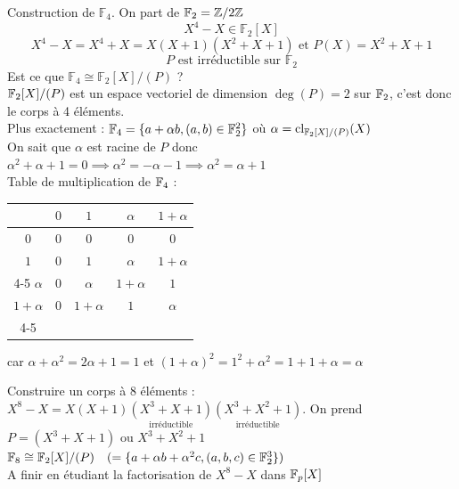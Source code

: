 \documentclass[]{report}
\begin{document}
    \begin{ex}{}{}
        Construction de $\mathbb{F}_4$. On part de $\mathbb{F}_2=\mathbb{Z}/2\mathbb{Z}$
        \[X^4-X\in\mathbb{F}_2[X]\]
        \[X^4-X=X^4+X=X(X+1)(X^2+X+1)\text{ et } P (X)=X^2+X+1\]
        \[P \text{ est irréductible sur }\mathbb{F}_2\]
        Est ce que $\mathbb{F}_4 \cong\mathbb{F}_2[X]/ (P)$ ?\\
        $\mathbb{F}_2[X]/(P)$ est un espace vectoriel de dimension $\deg(P)=2$ sur $\mathbb{F}_2$, c'est donc le corps à 4 éléments.\\
        Plus exactement : $\mathbb{F}_4=\{a+\alpha b,(a,b)\in\mathbb{F}_2^2\}$ où $\alpha={\text{cl}}_{\mathbb{F}_2[X]/(P)}(X)$\\
        On sait que $\alpha$ est racine de $P$ donc $\alpha^2+\alpha+1=0\implies \alpha^2=-\alpha-1\implies\alpha^2=\alpha+1$\\
        Table de multiplication de $\mathbb{F}_4$ :\\
        \begin{center}
            \begin{tabular}{c|c c c c}
                     &$0$&$1$& $\alpha$&$1+\alpha$\\
            \hline
            $0$&$0$&$0$&$0$&$0$\\
            $1$&$0$&$1$&$\alpha$&$1+\alpha$\\
            \cline{4-5}
            $\alpha$&$0$&$\alpha$&\multicolumn{1}{|c}{$1+\alpha$}&\multicolumn{1}{c|}{$1$}\\
            $1+\alpha$&$0$&$1+\alpha$&\multicolumn{1}{|c}{$1$}&\multicolumn{1}{c|}{$\alpha$}\\
            \cline{4-5}
            \end{tabular}
        \end{center}
        \begin{center}
            car $\alpha+\alpha^2=2\alpha+1=1$ et $(1+\alpha)^2=1^2+\alpha^2=1+1+\alpha=\alpha$
        \end{center}
    \end{ex}

    \begin{ex}{}
    Construire un corps à 8 éléments : \\
    $X^8-X=X(X+1)\underset{\text{irréductible}}{(X^3+X+1)}\underset{\text{irréductible}}{(X^3+X^2+1)}$. On prend $P=(X^3+X+1)$ ou $X^3+X^2+1$\\
    $\mathbb{F}_8\cong\mathbb{F}_2[X]/(P)\quad(=\{a+\alpha b+\alpha^2c,(a,b,c)\in\mathbb{F}_2^3\})$\\
    A finir en étudiant la factorisation de $X^8-X$ dans $\mathbb{F}_p[X]$
    \end{ex}
\end{document}
